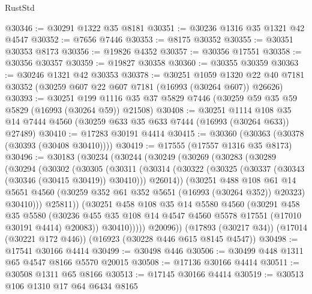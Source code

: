 \begin{lexlean}{RustStd}
\begin{coremodule}
@30346 := @30291 @1322 @35 @8181
@30351 := @30236 @1316 @35 @1321 @42 @4547
@30352 := @7656 @7446
@30353 := @8175 @30352
@30355 := @30351 @30353 @8173
@30356 := @19826 @4352
@30357 := @30356 @17551
@30358 := @30356 @30357
@30359 := @19827 @30358
@30360 := @30355 @30359
@30363 := @30246 @1321 @42 @30353
@30378 := @30251
    @1059
    @1320
    @22
    @40
    @7181
    @30352
    (@30259 @607 @22 @607 @7181 (@16993 (@30264 @607)) @26626)
@30393 := @30251
    @199
    @1116
    @35
    @37
    @5829
    @7446
    (@30259 @59 @35 @59 @5829 (@16993 (@30264 @59)) @21508)
@30408 := @30251
    @1114
    @108
    @35
    @14
    @7444
    @4560
    (@30259 @633 @35 @633 @7444 (@16993 (@30264 @633)) @27489)
@30410 := @17283 @30191 @4414
@30415 := @30360 (@30363 (@30378 (@30393 (@30408 @30410))))
@30419 := @17555 (@17557 @1316 @35 @8173)
@30496 := @30183
    (@30234
      (@30244
        (@30249
          (@30269
            (@30283
              (@30289
                (@30294
                  (@30302
                    (@30305
                      (@30311
                        (@30314
                          (@30322
                            (@30325 (@30337 (@30343 (@30346 (@30415 @30419)) @30410)))
                            @26014))
                        (@30251
                          @488
                          @108
                          @61
                          @14
                          @5651
                          @4560
                          (@30259 @352 @61 @352 @5651 (@16993 (@30264 @352)) @20323)
                          @30410)))
                    @25811))
                (@30251
                  @458
                  @108
                  @35
                  @14
                  @5580
                  @4560
                  (@30291
                    @458
                    @35
                    @5580
                    (@30236
                      @455
                      @35
                      @108
                      @14
                      @4547
                      @4560
                      @5578
                      @17551
                      (@17010 @30191 @4414)
                      @20083))
                  @30410)))))
        @20096))
    (@17893 (@30217 @34))
    (@17014 (@30221 @172 @446))
    (@16923 (@30228 @446 @615 @8145 @4547))
@30498 := @17541 @30166 @4414
@30499 := @30498 @446
@30506 := @30499 @448 @1311 @65 @4547 @8166 @5570 @20015
@30508 := @17136 @30166 @4414
@30511 := @30508 @1311 @65 @8166
@30513 := @17145 @30166 @4414
@30519 := @30513 @106 @1310 @17 @64 @6434 @8165

\end{coremodule}
\end{lexlean}
